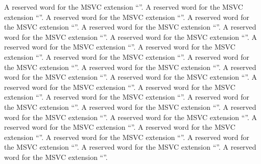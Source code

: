  A reserved word for the MSVC extension ``''.
 A reserved word for the MSVC extension ``''.
 A reserved word for the MSVC extension ``''.
 A reserved word for the MSVC extension ``''.
 A reserved word for the MSVC extension ``''.
 A reserved word for the MSVC extension ``''.
 A reserved word for the MSVC extension ``''.
 A reserved word for the MSVC extension ``''.
 A reserved word for the MSVC extension ``''.
 A reserved word for the MSVC extension ``''.
 A reserved word for the MSVC extension ``''.
 A reserved word for the MSVC extension ``''.
 A reserved word for the MSVC extension ``''.
 A reserved word for the MSVC extension ``''.
 A reserved word for the MSVC extension ``''.
 A reserved word for the MSVC extension ``''.
 A reserved word for the MSVC extension ``''.
 A reserved word for the MSVC extension ``''.
 A reserved word for the MSVC extension ``''.
 A reserved word for the MSVC extension ``''.
 A reserved word for the MSVC extension ``''.
 A reserved word for the MSVC extension ``''.
 A reserved word for the MSVC extension ``''.
 A reserved word for the MSVC extension ``''.
 A reserved word for the MSVC extension ``''.
 A reserved word for the MSVC extension ``''.
 A reserved word for the MSVC extension ``''.
